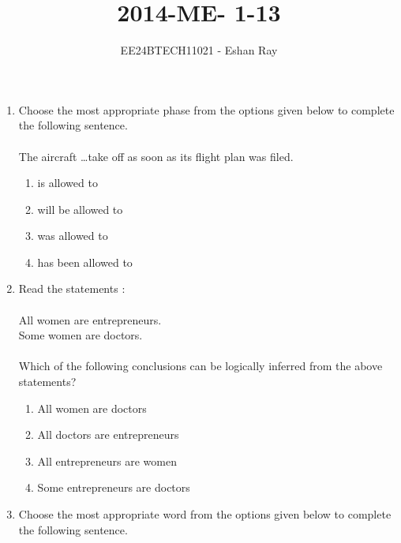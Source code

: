 \documentclass[journal]{IEEEtran}
\begin{document}

\vspace{3cm}

\title{2014-ME- 1-13}
\author{EE24BTECH11021 - Eshan Ray}

{\let\newpage\relax\maketitle}

\renewcommand{\thefigure}{\theenumi}
\renewcommand{\thetable}{\theenumi}
\setlength{\intextsep}{10pt} %

\begin{enumerate}
    \item Choose the most appropriate phase from the options given below to complete the following sentence.\\ \\
    The aircraft \dots take off as soon as its flight plan was filed.    
    \begin{enumerate}
        \item is allowed to
        \item will be allowed to
        \item was allowed to
        \item has been allowed to
    \end{enumerate}
    \item Read the statements $\colon$ \\ \\
    All women are entrepreneurs.\\
    Some women are doctors. \\ \\
    Which of the following conclusions can be logically inferred from the above statements?
    \begin{enumerate}
        \item All women are doctors
        \item All doctors are entrepreneurs
        \item All entrepreneurs are women
        \item Some entrepreneurs are doctors
    \end{enumerate}
    \item Choose the most appropriate word from the options given below to complete the following sentence.\\ \\

\end{enumerate}
\end{document}
